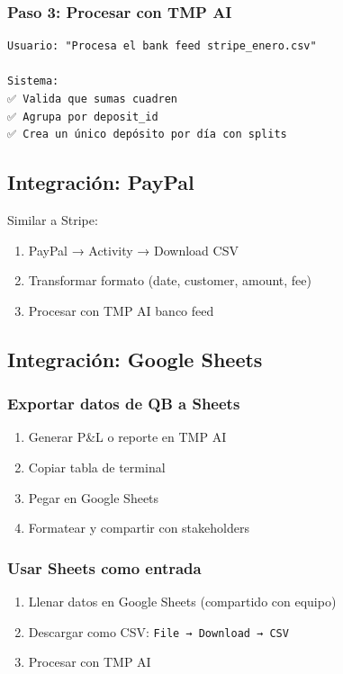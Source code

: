 \documentclass[12pt,oneside]{article}
\begin{document}
\subsubsection{Paso 3: Procesar con TMP AI}

\begin{verbatim}
Usuario: "Procesa el bank feed stripe_enero.csv"

Sistema:
✅ Valida que sumas cuadren
✅ Agrupa por deposit_id
✅ Crea un único depósito por día con splits
\end{verbatim}

\subsection{Integración: PayPal}

Similar a Stripe:

\begin{enumerate}
    \item PayPal → Activity → Download CSV
    \item Transformar formato (date, customer, amount, fee)
    \item Procesar con TMP AI banco feed
\end{enumerate}

\subsection{Integración: Google Sheets}

\subsubsection{Exportar datos de QB a Sheets}

\begin{enumerate}
    \item Generar P\&L o reporte en TMP AI
    \item Copiar tabla de terminal
    \item Pegar en Google Sheets
    \item Formatear y compartir con stakeholders
\end{enumerate}

\subsubsection{Usar Sheets como entrada}

\begin{enumerate}
    \item Llenar datos en Google Sheets (compartido con equipo)
    \item Descargar como CSV: \texttt{File → Download → CSV}
    \item Procesar con TMP AI
\end{enumerate}
\end{document}
